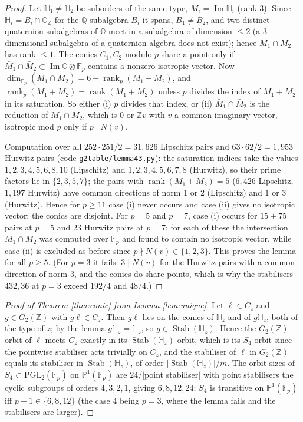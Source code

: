 \documentclass[11pt]{amsart}
\theoremstyle{definition}
\renewcommand{\O}{\mathbb{O}}\newcommand{\Sd}{\mathbb{S}}\newcommand{\Hq}{\mathbb{H}}\newcommand{\Z}{\mathbb{Z}}\newcommand{\Q}{\mathbb{Q}}\newcommand{\R}{\mathbb{R}}\newcommand{\C}{\mathbb{C}}\newcommand{\F}{\mathbb{F}}
\newcommand{\Stab}{\operatorname{Stab}}\newcommand{\Aut}{\operatorname{Aut}}\newcommand{\Der}{\operatorname{Der}}\renewcommand{\Im}{\operatorname{Im}}
\begin{document}
\begin{proof}
Let $\Hq_1\ne\Hq_2$ be suborders of the same type, $M_i=\Im\Hq_i$ (rank $3$). Since $\Hq_i=B_i\cap\O_\Z$ for the $\Q$-subalgebra $B_i$ it spans, $B_1\ne B_2$, and two distinct quaternion subalgebras of $\O$ meet in a subalgebra of dimension $\le 2$ (a $3$-dimensional subalgebra of a quaternion algebra does not exist); hence $M_1\cap M_2$ has rank $\le 1$. The conics $C_1,C_2$ modulo $p$ share a point only if $\bar M_1\cap\bar M_2\subset\Im\O\otimes\F_p$ contains a nonzero isotropic vector. Now $\dim_{\F_p}(\bar M_1\cap\bar M_2)=6-\operatorname{rank}_p(M_1+M_2)$, and $\operatorname{rank}_p(M_1+M_2)=\operatorname{rank}(M_1+M_2)$ unless $p$ divides the index of $M_1+M_2$ in its saturation. So either (i) $p$ divides that index, or (ii) $\bar M_1\cap\bar M_2$ is the reduction of $M_1\cap M_2$, which is $0$ or $\Z v$ with $v$ a common imaginary vector, isotropic mod $p$ only if $p\mid N(v)$.

Computation over all $252\cdot 251/2=31{,}626$ Lipschitz pairs and $63\cdot 62/2=1{,}953$ Hurwitz pairs (code \texttt{g2table/lemma43.py}): the saturation indices take the values $1,2,3,4,5,6,8,10$ (Lipschitz) and $1,2,3,4,5,6,7,8$ (Hurwitz), so their prime factors lie in $\{2,3,5,7\}$; the pairs with $\operatorname{rank}(M_1+M_2)=5$ ($6{,}426$ Lipschitz, $1{,}197$ Hurwitz) have common directions of norm $1$ or $2$ (Lipschitz) and $1$ or $3$ (Hurwitz). Hence for $p\ge 11$ case (i) never occurs and case (ii) gives no isotropic vector: the conics are disjoint. For $p=5$ and $p=7$, case (i) occurs for $15+75$ pairs at $p=5$ and $23$ Hurwitz pairs at $p=7$; for each of these the intersection $\bar M_1\cap\bar M_2$ was computed over $\F_p$ and found to contain no isotropic vector, while case (ii) is excluded as before since $p\nmid N(v)\in\{1,2,3\}$. This proves the lemma for all $p\ge 5$. (For $p=3$ it fails: $3\mid N(v)$ for the Hurwitz pairs with a common direction of norm $3$, and the conics do share points, which is why the stabilisers $432,36$ at $p=3$ exceed $192/4$ and $48/4$.)
\end{proof}
\begin{proof}[Proof of Theorem \ref{thm:conic} from Lemma \ref{lem:unique}]
Let $\ell\in C_z$ and $g\in G_2(\Z)$ with $g\ell\in C_z$. Then $g\ell$ lies on the conics of $\Hq_z$ and of $g\Hq_z$, both of the type of $z$; by the lemma $g\Hq_z=\Hq_z$, so $g\in\Stab(\Hq_z)$. Hence the $G_2(\Z)$-orbit of $\ell$ meets $C_z$ exactly in its $\Stab(\Hq_z)$-orbit, which is its $S_4$-orbit since the pointwise stabiliser acts trivially on $C_z$, and the stabiliser of $\ell$ in $G_2(\Z)$ equals its stabiliser in $\Stab(\Hq_z)$, of order $|\Stab(\Hq_z)|/m$. The orbit sizes of $S_4\subset\mathrm{PGL}_2(\F_p)$ on $\mathbb P^1(\F_p)$ are $24/|$point stabiliser$|$ with point stabilisers the cyclic subgroups of orders $4,3,2,1$, giving $6,8,12,24$; $S_4$ is transitive on $\mathbb P^1(\F_p)$ iff $p+1\in\{6,8,12\}$ (the case $4$ being $p=3$, where the lemma fails and the stabilisers are larger).
\end{proof}
\end{document}
